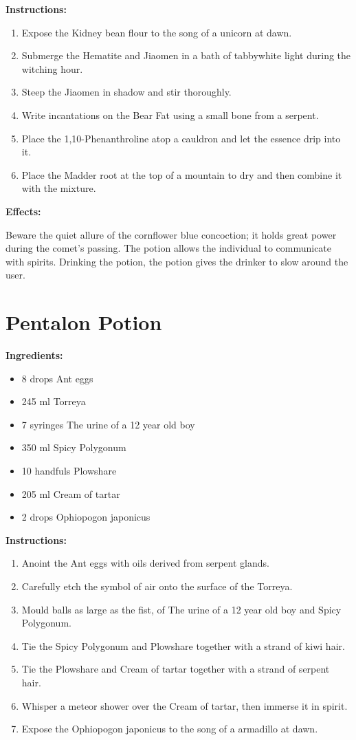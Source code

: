\documentclass{article}
\begin{document}
\textbf{Instructions:}

\begin{enumerate}
  \item Expose the Kidney bean flour to the song of a unicorn at dawn.
  \item Submerge the Hematite and Jiaomen in a bath of tabbywhite light during the witching hour.
  \item Steep the Jiaomen in shadow and stir thoroughly.
  \item Write incantations on the Bear Fat using a small bone from a serpent.
  \item Place the 1,10-Phenanthroline atop a cauldron and let the essence drip into it.
  \item Place the Madder root at the top of a mountain to dry and then combine it with the mixture.
\end{enumerate}

\textbf{Effects:}

Beware the quiet allure of the cornflower blue concoction; it holds great power during the comet’s passing. The potion allows the individual to communicate with spirits. Drinking the potion, the potion gives the drinker to slow around the user.

\newpage
\section*{Pentalon Potion}

\textbf{Ingredients:}

\begin{itemize}
  \item 8 drops Ant eggs
  \item 245 ml Torreya
  \item 7 syringes The urine of a 12 year old boy
  \item 350 ml Spicy Polygonum
  \item 10 handfuls Plowshare
  \item 205 ml Cream of tartar
  \item 2 drops Ophiopogon japonicus
\end{itemize}

\textbf{Instructions:}

\begin{enumerate}
  \item Anoint the Ant eggs with oils derived from serpent glands.
  \item Carefully etch the symbol of air onto the surface of the Torreya.
  \item Mould balls as large as the fist, of The urine of a 12 year old boy and Spicy Polygonum.
  \item Tie the Spicy Polygonum and Plowshare together with a strand of kiwi hair.
  \item Tie the Plowshare and Cream of tartar together with a strand of serpent hair.
  \item Whisper a meteor shower over the Cream of tartar, then immerse it in spirit.
  \item Expose the Ophiopogon japonicus to the song of a armadillo at dawn.
\end{enumerate}
\end{document}

